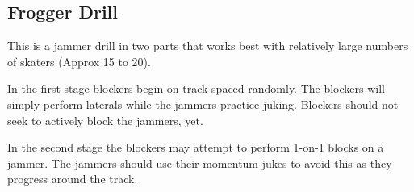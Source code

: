 \subsection{Frogger Drill}

This is a jammer drill in two parts that works best with relatively large numbers of skaters (Approx 15 to 20).

In the first stage blockers begin on track spaced randomly.
The blockers will simply perform laterals while the jammers practice juking.
Blockers should not seek to actively block the jammers, yet.



In the second stage the blockers may attempt to perform 1-on-1 blocks on a jammer.
The jammers should use their momentum jukes to avoid this as they progress around the track. 
